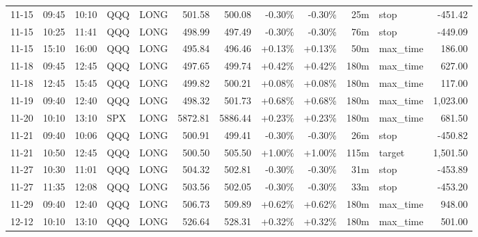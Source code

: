 \documentclass[11pt,a4paper]{article}
\begin{document}
\begin{center}
\begin{longtable}{>{\color{txtmain}}l l l l l r r r r r >{\color{txtmain}}l r}
11-15 & 09:45 & 10:10 & QQQ & LONG & 501.58 & 500.08 & \textcolor{lossred}{-0.30\%} & \textcolor{lossred}{-0.30\%} & 25m & stop & \textcolor{lossred}{-451.42} \\
11-15 & 10:25 & 11:41 & QQQ & LONG & 498.99 & 497.49 & \textcolor{lossred}{-0.30\%} & \textcolor{lossred}{-0.30\%} & 76m & stop & \textcolor{lossred}{-449.09} \\
11-15 & 15:10 & 16:00 & QQQ & LONG & 495.84 & 496.46 & \textcolor{wingreen}{+0.13\%} & \textcolor{wingreen}{+0.13\%} & 50m & max\_time & \textcolor{wingreen}{186.00} \\
11-18 & 09:45 & 12:45 & QQQ & LONG & 497.65 & 499.74 & \textcolor{wingreen}{+0.42\%} & \textcolor{wingreen}{+0.42\%} & 180m & max\_time & \textcolor{wingreen}{627.00} \\
11-18 & 12:45 & 15:45 & QQQ & LONG & 499.82 & 500.21 & \textcolor{wingreen}{+0.08\%} & \textcolor{wingreen}{+0.08\%} & 180m & max\_time & \textcolor{wingreen}{117.00} \\
11-19 & 09:40 & 12:40 & QQQ & LONG & 498.32 & 501.73 & \textcolor{wingreen}{+0.68\%} & \textcolor{wingreen}{+0.68\%} & 180m & max\_time & \textcolor{wingreen}{1,023.00} \\
11-20 & 10:10 & 13:10 & SPX & LONG & 5872.81 & 5886.44 & \textcolor{wingreen}{+0.23\%} & \textcolor{wingreen}{+0.23\%} & 180m & max\_time & \textcolor{wingreen}{681.50} \\
11-21 & 09:40 & 10:06 & QQQ & LONG & 500.91 & 499.41 & \textcolor{lossred}{-0.30\%} & \textcolor{lossred}{-0.30\%} & 26m & stop & \textcolor{lossred}{-450.82} \\
11-21 & 10:50 & 12:45 & QQQ & LONG & 500.50 & 505.50 & \textcolor{wingreen}{+1.00\%} & \textcolor{wingreen}{+1.00\%} & 115m & target & \textcolor{wingreen}{1,501.50} \\
11-27 & 10:30 & 11:01 & QQQ & LONG & 504.32 & 502.81 & \textcolor{lossred}{-0.30\%} & \textcolor{lossred}{-0.30\%} & 31m & stop & \textcolor{lossred}{-453.89} \\
11-27 & 11:35 & 12:08 & QQQ & LONG & 503.56 & 502.05 & \textcolor{lossred}{-0.30\%} & \textcolor{lossred}{-0.30\%} & 33m & stop & \textcolor{lossred}{-453.20} \\
11-29 & 09:40 & 12:40 & QQQ & LONG & 506.73 & 509.89 & \textcolor{wingreen}{+0.62\%} & \textcolor{wingreen}{+0.62\%} & 180m & max\_time & \textcolor{wingreen}{948.00} \\
12-12 & 10:10 & 13:10 & QQQ & LONG & 526.64 & 528.31 & \textcolor{wingreen}{+0.32\%} & \textcolor{wingreen}{+0.32\%} & 180m & max\_time & \textcolor{wingreen}{501.00} \\

\end{longtable}
\end{center}
\end{document}
